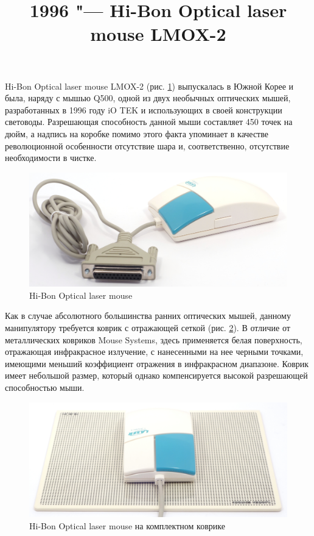 \documentclass[11pt, a4paper]{article}
\begin{document}
\title{1996 "--- Hi-Bon Optical laser mouse LMOX-2}
\date{}
\maketitle

    Hi-Bon Optical laser mouse LMOX-2 (рис. \ref{fig:OpticalLaserMousePic}) выпускалась в Южной Корее и была, наряду с мышью Q500, одной из двух необычных оптических мышей, разработанных в 1996 году iO TEK и использующих в своей конструкции световоды. Разрешающая способность данной мыши составляет 450 точек на дюйм, а надпись на коробке помимо этого факта упоминает в качестве революционной особенности отсутствие шара и, соответственно, отсутствие необходимости в чистке.

\begin{figure}[h]
    \centering
    \includegraphics[scale=0.4]{1996_hi-bon_laser_mouse/pic_30.jpg}
    \caption{Hi-Bon Optical laser mouse}
    \label{fig:OpticalLaserMousePic}
\end{figure}

Как в случае абсолютного большинства ранних оптических мышей, данному манипулятору требуется коврик с отражающей сеткой (рис. \ref{fig:OpticalLaserMousePad}). В отличие от металлических ковриков Mouse Systems, здесь применяется белая поверхность, отражающая инфракрасное излучение, с нанесенными на нее черными точками, имеющими меньший коэффициент отражения в инфракрасном диапазоне. Коврик имеет небольшой размер, который однако компенсируется высокой разрешающей способностью мыши.

\begin{figure}[h]
    \centering
    \includegraphics[scale=0.4]{1996_hi-bon_laser_mouse/pic2_30.jpg}
    \caption{Hi-Bon Optical laser mouse на комплектном коврике}
    \label{fig:OpticalLaserMousePad}
\end{figure}
\end{document}
